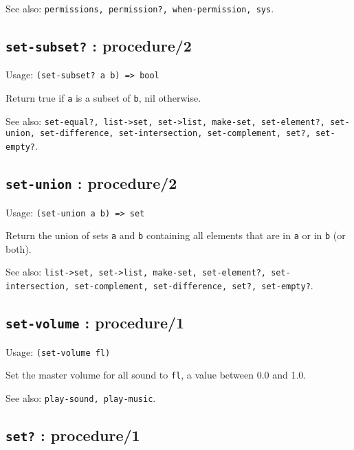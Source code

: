 \documentclass[
]{article}
\newcommand{\passthrough}[1]{#1}
\begin{document}
See also:
\passthrough{\lstinline!permissions, permission?, when-permission, sys!}.

\hypertarget{set-subset-procedure2-1}{%
\subsection{\texorpdfstring{\texttt{set-subset?} :
procedure/2}{set-subset? : procedure/2}}\label{set-subset-procedure2-1}}

Usage: \passthrough{\lstinline!(set-subset? a b) => bool!}

Return true if \passthrough{\lstinline!a!} is a subset of
\passthrough{\lstinline!b!}, nil otherwise.

See also:
\passthrough{\lstinline!set-equal?, list->set, set->list, make-set, set-element?, set-union, set-difference, set-intersection, set-complement, set?, set-empty?!}.

\hypertarget{set-union-procedure2-1}{%
\subsection{\texorpdfstring{\texttt{set-union} :
procedure/2}{set-union : procedure/2}}\label{set-union-procedure2-1}}

Usage: \passthrough{\lstinline!(set-union a b) => set!}

Return the union of sets \passthrough{\lstinline!a!} and
\passthrough{\lstinline!b!} containing all elements that are in
\passthrough{\lstinline!a!} or in \passthrough{\lstinline!b!} (or both).

See also:
\passthrough{\lstinline!list->set, set->list, make-set, set-element?, set-intersection, set-complement, set-difference, set?, set-empty?!}.

\hypertarget{set-volume-procedure1-1}{%
\subsection{\texorpdfstring{\texttt{set-volume} :
procedure/1}{set-volume : procedure/1}}\label{set-volume-procedure1-1}}

Usage: \passthrough{\lstinline!(set-volume fl)!}

Set the master volume for all sound to \passthrough{\lstinline!fl!}, a
value between 0.0 and 1.0.

See also: \passthrough{\lstinline!play-sound, play-music!}.

\hypertarget{set-procedure1-1}{%
\subsection{\texorpdfstring{\texttt{set?} :
procedure/1}{set? : procedure/1}}\label{set-procedure1-1}}
\end{document}
